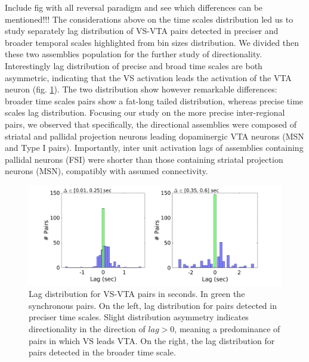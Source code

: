 {\color{red}Include fig with all reversal paradigm and see which differences can be mentioned!!!}
The considerations above on the time scales distribution led us to study separately lag distribution of VS-VTA pairs detected in preciser and broader temporal scales highlighted from bin sizes distribution. We divided then these two assemblies population for the further study of directionality.
Interestingly lag distribution of precise and broad time scales are both asymmetric, indicating that the VS activation leads the activation of the VTA neuron (fig. \ref{fig:LagInSecAll}). The two distribution show however remarkable differences: broader time scales pairs show a fat-long tailed distribution, whereas precise time scales lag distribution.
Focusing our study on the more precise inter-regional pairs, we observed that specifically, the directional assemblies were composed of striatal and pallidal projection neurons leading dopaminergic VTA neurons (MSN and Type I pairs). Importantly, inter unit activation lags of assemblies containing pallidal neurons (FSI) were shorter than those containing striatal projection neurons (MSN), compatibly with assumed connectivity.
\begin{figure}[H]
\centering
\includegraphics[scale=0.3]{figures/LagGeneralInSec.png}
\caption{Lag distribution for VS-VTA pairs in seconds. In green the synchronous pairs. On the left, lag distribution for pairs detected in preciser time scales. Slight distribution asymmetry indicates directionality in the direction of $lag > 0$, meaning a predominance of pairs in which VS leads VTA. On the right, the lag distribution for pairs detected in the broader time scale.}
\label{fig:LagInSecAll}
\end{figure}

